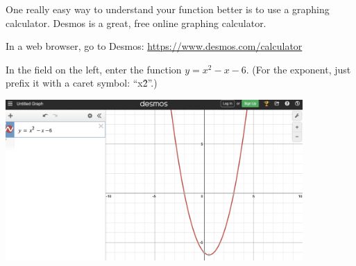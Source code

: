 One really easy way to understand your function better is to use a graphing
calculator. Desmos is a great, free online graphing calculator. 

In a web browser, go to Desmos: \url{https://www.desmos.com/calculator}

In the field on the left, enter the function $y = x^2 - x - 6$. (For
the exponent, just prefix it with a caret symbol: ``x\^2''.)

\includegraphics[width=0.85\textwidth]{Desmos.png}
